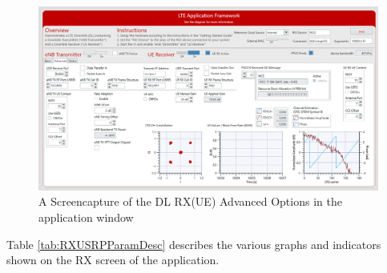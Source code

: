 \begin{figure}[H]
    \centering
    \includegraphics[width=\linewidth]{images/SISORXADVEdited.png}
    \caption{A Screencapture of the DL RX(UE) Advanced Options in the application window}
    \label{fig:DLRXAdvScreen}
\end{figure}

Table \ref{tab:RXUSRPParamDesc} describes the various graphs and indicators shown on the RX screen of the application.

